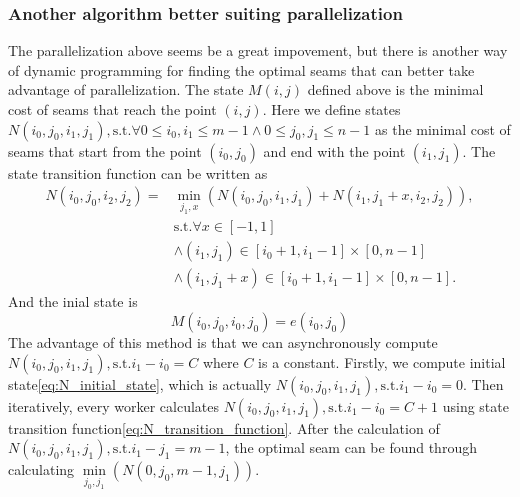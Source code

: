 \documentclass[final]{cvpr}
\begin{document}
\subsubsection{Another algorithm better suiting parallelization}
The parallelization above seems be a great impovement, but there is another way of dynamic programming for finding the optimal seams that can better take advantage of parallelization.
The state $M(i,j)$ defined above is the minimal cost of seams that reach the point $(i,j)$.
Here we define states $N(i_0,j_0,i_1,j_1),\text{s.t.}\forall0\le i_0,i_1\le m-1\wedge0\le j_0,j_1\le n-1$ as the minimal cost of seams that start from the point $(i_0,j_0)$ and end with the point $(i_1,j_1)$.
The state transition function can be written as
\begin{equation}
    \begin{aligned}
    N(i_0,j_0,i_2,j_2)=&\min\limits_{j_1,x}(N(i_0,j_0,i_1,j_1)+N(i_1,j_1+x,i_2,j_2)),\\
    &\text{s.t.}\forall x\in [-1,1]\\
    &\wedge(i_1,j_1)\in[i_0+1,i_1-1]\times[0,n-1]\\
    &\wedge(i_1,j_1+x)\in[i_0+1,i_1-1]\times[0,n-1].
    \end{aligned}
    \label{eq:N_transition_function}
\end{equation}
And the inial state is
\begin{equation}
    M(i_0,j_0,i_0,j_0)=e(i_0,j_0)
    \label{eq:N_initial_state}
\end{equation}
The advantage of this method is that we can asynchronously compute $N(i_0,j_0,i_1,j_1),\text{s.t.}i_1-i_0=C$ where $C$ is a constant.
Firstly, we compute initial state\ref{eq:N_initial_state}, which is actually $N(i_0,j_0,i_1,j_1),\text{s.t.}i_1-i_0=0$.
Then iteratively, every worker calculates $N(i_0,j_0,i_1,j_1),\text{s.t.}i_1-i_0=C+1$ using state transition function\ref{eq:N_transition_function}.
After the calculation of $N(i_0,j_0,i_1,j_1),\text{s.t.}i_1-j_1=m-1$, the optimal seam can be found through calculating $\min\limits_{j_0,j_1}(N(0,j_0,m-1,j_1))$.
\end{document}
